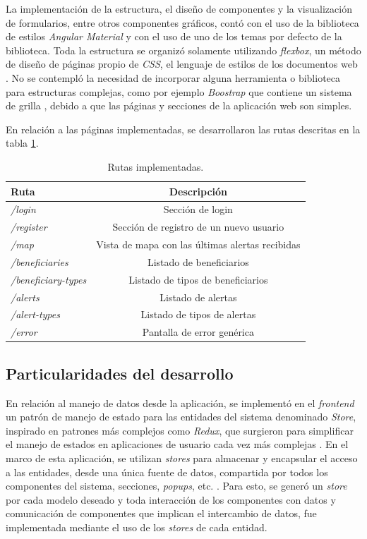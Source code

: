 La implementación de la estructura, el diseño de componentes y la visualización de formularios, entre otros componentes gráficos, contó con el uso de la biblioteca de estilos \textit{Angular Material} y con el uso de uno de los temas por defecto de la biblioteca. Toda la estructura se organizó solamente utilizando \textit{flexbox}, un método de diseño de páginas propio de \textit{CSS}, el lenguaje de estilos de los documentos web \citep{CSS:1}. No se contempló la necesidad de incorporar alguna herramienta o biblioteca para estructuras complejas, como por ejemplo \textit{Boostrap} que contiene un sistema de grilla \citep{BOOTSTRAP:1}, debido a que las páginas y secciones de la aplicación web son simples.

En relación a las páginas implementadas, se desarrollaron las rutas descritas en la tabla \ref{tab:frontend:pages}.

\begin{table}[H]
	\centering
	\caption[Rutas implementadas.]{Rutas implementadas.}
	\begin{tabular}{l c}    
		\toprule
		\textbf{Ruta} 	 & \textbf{Descripción} \\
		\midrule
		\textit{/login} & Sección de login  \\	
		\textit{/register} & Sección de registro de un nuevo usuario \\		
		\textit{/map} & Vista de mapa con las últimas alertas recibidas  \\
		\textit{/beneficiaries} & Listado de beneficiarios  \\	
		\textit{/beneficiary-types} & Listado de tipos de beneficiarios  \\		
		\textit{/alerts} & Listado de alertas  \\
		\textit{/alert-types} & Listado de tipos de alertas  \\
		\textit{/error} & Pantalla de error genérica  \\	
		\bottomrule
		\hline
	\end{tabular}
	\label{tab:frontend:pages}
\end{table}

\subsection{Particularidades del desarrollo}

En relación al manejo de datos desde la aplicación, se implementó en el \textit{frontend} un patrón de manejo de estado para las entidades del sistema denominado \textit{Store}, inspirado en patrones más complejos como \textit{Redux}, que surgieron para simplificar el manejo de estados en aplicaciones de usuario cada vez más complejas \citep{REDUX:1}. En el marco de esta aplicación, se utilizan \textit{stores} para almacenar y encapsular el acceso a las entidades, desde una única fuente de datos, compartida por todos los componentes del sistema, secciones, \textit{popups}, etc. \citep{ANGULAR:6}. Para esto, se generó un \textit{store} por cada modelo deseado y toda interacción de los componentes con datos y comunicación de componentes que implican el intercambio de datos, fue implementada mediante el uso de los \textit{stores} de cada entidad.

